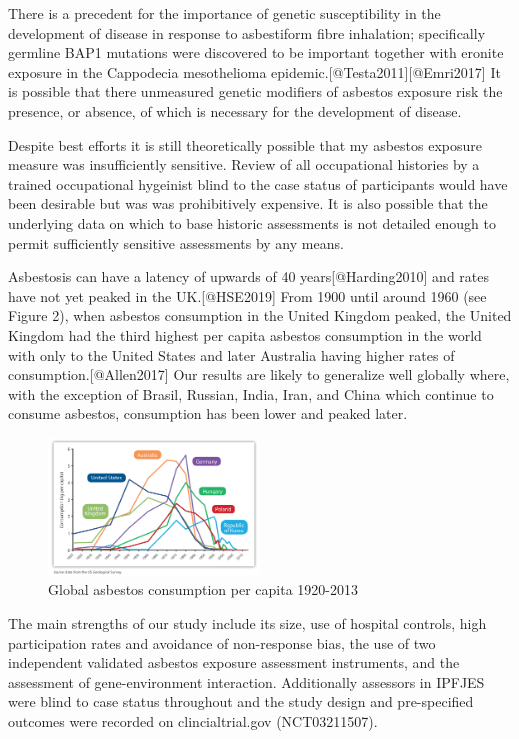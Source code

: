 \documentclass[
]{article}
\begin{document}
There is a precedent for the importance of genetic susceptibility in the
development of disease in response to asbestiform fibre inhalation;
specifically germline BAP1 mutations were discovered to be important
together with eronite exposure in the Cappodecia mesothelioma
epidemic.{[}@Testa2011{]}{[}@Emri2017{]} It is possible that there
unmeasured genetic modifiers of asbestos exposure risk the presence, or
absence, of which is necessary for the development of disease.

Despite best efforts it is still theoretically possible that my asbestos
exposure measure was insufficiently sensitive. Review of all
occupational histories by a trained occupational hygeinist blind to the
case status of participants would have been desirable but was was
prohibitively expensive. It is also possible that the underlying data on
which to base historic assessments is not detailed enough to permit
sufficiently sensitive assessments by any means.

Asbestosis can have a latency of upwards of 40 years{[}@Harding2010{]}
and rates have not yet peaked in the UK.{[}@HSE2019{]} From 1900 until
around 1960 (see Figure 2), when asbestos consumption in the United
Kingdom peaked, the United Kingdom had the third highest per capita
asbestos consumption in the world with only to the United States and
later Australia having higher rates of consumption.{[}@Allen2017{]} Our
results are likely to generalize well globally where, with the exception
of Brasil, Russian, India, Iran, and China which continue to consume
asbestos, consumption has been lower and peaked later.

\begin{figure}
\centering
\includegraphics[width=0.5\textwidth,height=\textheight]{source/figures/asbestos_consumption.png}
\caption{Global asbestos consumption per capita 1920-2013}
\end{figure}

The main strengths of our study include its size, use of hospital
controls, high participation rates and avoidance of non-response bias,
the use of two independent validated asbestos exposure assessment
instruments, and the assessment of gene-environment interaction.
Additionally assessors in IPFJES were blind to case status throughout
and the study design and pre-specified outcomes were recorded on
clincialtrial.gov (NCT03211507).
\end{document}
